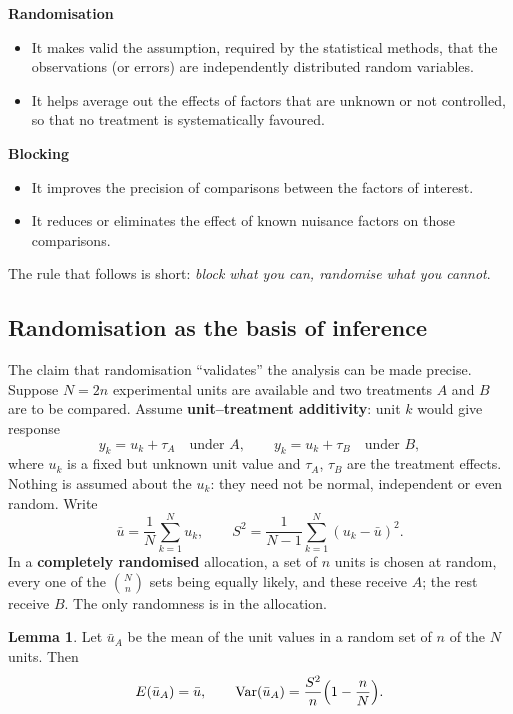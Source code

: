 \documentclass[11pt,a4paper]{article}
\numberwithin{equation}{section}
\DeclareMathOperator{\Var}{Var}
\theoremstyle{definition}
\newtheorem{lem}[thm]{Lemma}
\newcommand{\subhead}[1]{%
  \par\medskip\noindent\textbf{#1}\par\nobreak\smallskip}
\begin{document}
\subhead{Randomisation}
\begin{itemize}
\item It makes valid the assumption, required by the statistical methods, that the observations (or errors) are independently distributed
random variables.
\item It helps average out the effects of factors that are unknown or not controlled, so that no treatment is systematically favoured.
\end{itemize}

\subhead{Blocking}
\begin{itemize}
\item It improves the precision of comparisons between the factors of interest.
\item It reduces or eliminates the effect of known nuisance factors on those comparisons.
\end{itemize}

The rule that follows is short: \emph{block what you can, randomise what you cannot}.

\subsection{Randomisation as the basis of inference}
The claim that randomisation ``validates'' the analysis can be made precise. Suppose $N = 2n$ experimental units are available and
two treatments $A$ and $B$ are to be compared. Assume \textbf{unit--treatment additivity}: unit $k$ would give response
\[
y_k = u_k + \tau_A \quad\text{under } A , \qquad y_k = u_k + \tau_B \quad\text{under } B ,
\]
where $u_k$ is a fixed but unknown unit value and $\tau_A$, $\tau_B$ are the treatment effects. Nothing is assumed about the $u_k$: they need not
be normal, independent or even random. Write
\[
\bar u = \frac1N\sum_{k=1}^Nu_k , \qquad S^2 = \frac{1}{N - 1}\sum_{k=1}^N(u_k - \bar u)^2 .
\]
In a \textbf{completely randomised} allocation, a set of $n$ units is chosen at random, every one of the $\binom Nn$ sets being equally likely,
and these receive $A$; the rest receive $B$. The only randomness is in the allocation.

\begin{lem}\label{lem:srswor}
Let $\bar u_A$ be the mean of the unit values in a random set of $n$ of the $N$ units. Then
\[
E(\bar u_A) = \bar u , \qquad \Var(\bar u_A) = \frac{S^2}{n}\Bigl(1 - \frac nN\Bigr) .
\]
\end{lem}
\end{document}
